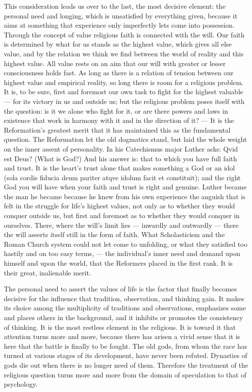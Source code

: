 \documentclass[12pt,a4paper,openany]{book}
\newcommand{\opage}[1]{\marginnote{\footnotesize\textit{[#1]}}}
\begin{document}
This consideration leads us over to the last, the most
decisive element: the personal need and longing, which is
unsatisfied by everything given, because it aims at something
that experience only imperfectly lets come into
possession. Through the concept of value religious faith is connected
with the will. Our faith is determined by what for us stands
as the highest value, which gives all else value, and by the
relation we think we find between the world of reality and
this highest value. All value rests on an aim that our
will with greater or lesser consciousness holds fast. As
long as there is a relation of tension between our highest value
and empirical reality, so long there is room for a
religious problem. It is, to be sure, first and foremost our
\opage{221}own task to fight for the highest valuable --- for
its victory in us and outside us; but the religious problem
poses itself with the question: is it we alone who fight
for it, or are there powers and laws in existence that work
in harmony with it and in the direction of it? --- It is the
Reformation's greatest merit that it has maintained this as the
fundamental question. The Reformation let the old dogmatics
stand, but laid the whole weight on the inner assent of
personality. In his Catechismus major Luther asks: Qvid est
Deus? (What is God?) And his answer is: that to which you have
full faith and trust. It is the heart's trust alone that makes
something a God or an idol (sola cordis fiducia deum
pariter atqve idolum facit et constituit); and the right God
you will have when your faith and trust is right and genuine. Luther
became the man he became because he knew from his own experience
the anguish that is felt in the struggle for life's highest values,
not only as to whether they would conquer outside us, but first and
foremost as to whether they would conquer in ourselves. There, where the will's
limit lies --- inwardly and outwardly --- there the will asserts
itself still in the form of faith. What Scholasticism and the Roman
Church system could not let come to unfolding, or what
they satisfied too hastily and on too easy terms, ---
the individual's inner need and demand upon himself and upon the world,
that the Reformers placed in the first rank. It is their
great, inalienable merit.

The personal need to assert the values of life is
the factor that finally becomes decisive for the influence
that tradition, observation, and thinking gain. It makes its
choice among the multiplicity of traditions and observations,
emphasizes some and places others in the background, and it
inhibits or promotes the consistency of thinking. It is
the most restless element in the religious. It is toward it
that attention turns more and more, because there has
arisen a vivid sense that it is here that the battle
is finally to be fought. The old gods, from whom the race has turned
at various stages of its development, have never
been refuted. Dynasties of gods die out when there is no longer
need of them. Therefore the treatment of the
\opage{222}religious question turns more and more from the domain of speculation to that of
psychology.
\end{document}

